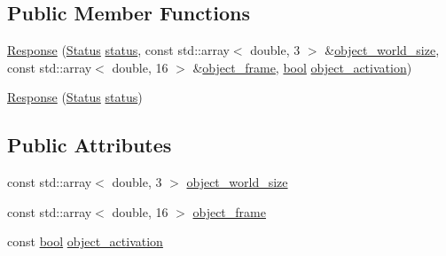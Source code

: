 \subsection*{Public Member Functions}
\begin{DoxyCompactItemize}
\item 
\hyperlink{structresearch__interface_1_1robot_1_1GetCartesianLimit_1_1Response_ae2247a577993b9a100333c9eaf15e6e6}{Response} (\hyperlink{structresearch__interface_1_1robot_1_1CommandBase_a63ff74649dc636bd79dc0dd34fb84df5}{Status} \hyperlink{structresearch__interface_1_1robot_1_1ResponseBase_a99bb821172a0ac77338cd8e0acbe8a96}{status}, const std\+::array$<$ double, 3 $>$ \&\hyperlink{structresearch__interface_1_1robot_1_1GetCartesianLimit_1_1Response_a0f7f582f1128d7945f8be5d7b8135a42}{object\+\_\+world\+\_\+size}, const std\+::array$<$ double, 16 $>$ \&\hyperlink{structresearch__interface_1_1robot_1_1GetCartesianLimit_1_1Response_ae08bd0aef674163b601408d225e0386b}{object\+\_\+frame}, \hyperlink{classbool}{bool} \hyperlink{structresearch__interface_1_1robot_1_1GetCartesianLimit_1_1Response_a107369740e060e2fff3ae01784a09eee}{object\+\_\+activation})
\item 
\hyperlink{structresearch__interface_1_1robot_1_1GetCartesianLimit_1_1Response_ae2305bdf64d0d365ebd4f3934df11f37}{Response} (\hyperlink{structresearch__interface_1_1robot_1_1CommandBase_a63ff74649dc636bd79dc0dd34fb84df5}{Status} \hyperlink{structresearch__interface_1_1robot_1_1ResponseBase_a99bb821172a0ac77338cd8e0acbe8a96}{status})
\end{DoxyCompactItemize}
\subsection*{Public Attributes}
\begin{DoxyCompactItemize}
\item 
const std\+::array$<$ double, 3 $>$ \hyperlink{structresearch__interface_1_1robot_1_1GetCartesianLimit_1_1Response_a0f7f582f1128d7945f8be5d7b8135a42}{object\+\_\+world\+\_\+size}
\item 
const std\+::array$<$ double, 16 $>$ \hyperlink{structresearch__interface_1_1robot_1_1GetCartesianLimit_1_1Response_ae08bd0aef674163b601408d225e0386b}{object\+\_\+frame}
\item 
const \hyperlink{classbool}{bool} \hyperlink{structresearch__interface_1_1robot_1_1GetCartesianLimit_1_1Response_a107369740e060e2fff3ae01784a09eee}{object\+\_\+activation}
\end{DoxyCompactItemize}


